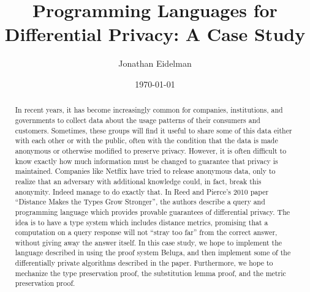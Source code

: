 \documentclass[11pt]{article}
\begin{document}
\title{Programming Languages for Differential Privacy: A Case Study}
\author{Jonathan Eidelman}
\date{\today}
\maketitle

\begin{abstract}
  In recent years, it has become increasingly common for companies, institutions, and governments to collect data about the usage patterns of their consumers and customers. Sometimes, these groups will find it useful to share some of this data either with each other or with the public, often with the condition that the data is made anonymous or otherwise modified to preserve privacy. However, it is often difficult to know exactly how much information must be changed to guarantee that privacy is maintained. Companies like Netflix have tried to release anonymous data, only to realize that an adversary with additional knowledge could, in fact, break this anonymity. Indeed \cite{narayanan2008} manage to do exactly that. In Reed and Pierce's 2010 paper ``Distance Makes the Types Grow Stronger'', the authors describe a query and programming language which provides provable guarantees of differential privacy\cite{reed2010}. The idea is to have a type system which includes distance metrics, promising that a computation on a query response will not ``stray too far'' from the correct answer, without giving away the answer itself. In this case study, we hope to implement the language described in \cite{reed2010} using the proof system Beluga, and then implement some of the differentially private algorithms described in the paper. Furthermore, we hope to mechanize the type preservation proof, the substitution lemma proof, and the metric preservation proof. 
\end{abstract}



\end{document}
